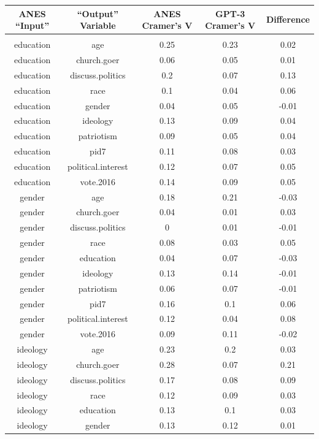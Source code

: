 \documentclass[11pt]{article}
\begin{document}
\begin{table}[!htbp] \centering

\renewcommand{\arraystretch}{0.9}
\begin{tabular}{@{\extracolsep{5pt}} ccccc}
\toprule{}
ANES ``Input'' & ``Output'' Variable & ANES Cramer's V & GPT-3 Cramer's V & Difference \\
\hline \\[-1.8ex]

education & age & 0.25 & 0.23 & 0.02 \\
education & church.goer & 0.06 & 0.05 & 0.01 \\
education & discuss.politics & 0.2 & 0.07 & 0.13 \\
education & race & 0.1 & 0.04 & 0.06 \\
education & gender & 0.04 & 0.05 & -0.01 \\
education & ideology & 0.13 & 0.09 & 0.04 \\
education & patriotism & 0.09 & 0.05 & 0.04 \\
education & pid7 & 0.11 & 0.08 & 0.03 \\
education & political.interest & 0.12 & 0.07 & 0.05 \\
education & vote.2016 & 0.14 & 0.09 & 0.05 \\
gender & age & 0.18 & 0.21 & -0.03 \\
gender & church.goer & 0.04 & 0.01 & 0.03 \\
gender & discuss.politics & 0 & 0.01 & -0.01 \\
gender & race & 0.08 & 0.03 & 0.05 \\
gender & education & 0.04 & 0.07 & -0.03 \\
gender & ideology & 0.13 & 0.14 & -0.01 \\
gender & patriotism & 0.06 & 0.07 & -0.01 \\
gender & pid7 & 0.16 & 0.1 & 0.06 \\
gender & political.interest & 0.12 & 0.04 & 0.08 \\
gender & vote.2016 & 0.09 & 0.11 & -0.02 \\
ideology & age & 0.23 & 0.2 & 0.03 \\
ideology & church.goer & 0.28 & 0.07 & 0.21 \\
ideology & discuss.politics & 0.17 & 0.08 & 0.09 \\
ideology & race & 0.12 & 0.09 & 0.03 \\
ideology & education & 0.13 & 0.1 & 0.03 \\
ideology & gender & 0.13 & 0.12 & 0.01 \\

\end{tabular}
\end{table}
\end{document}
